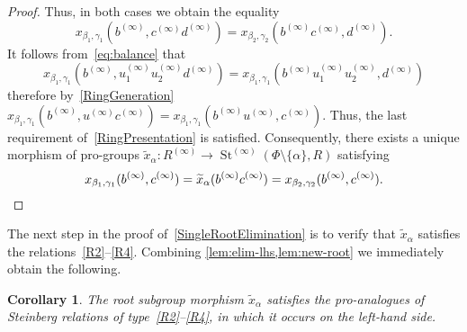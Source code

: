 \documentclass[oneside, 11pt]{amsart}
\numberwithin{equation}{section}
\newtheorem{corollary}[lemma]{Corollary}
\theoremstyle{definition}
\theoremstyle{remark}
\DeclareMathOperator\St{St}
\begin{document}
\begin{proof}
 Thus, in both cases we obtain the equality
 \begin{equation}\label{eq:balance}
 x_{\beta_1, \gamma_1}(b^{(\infty)}, c^{(\infty)} d^{(\infty)}) = x_{\beta_2, \gamma_2}(b^{(\infty)} c^{(\infty)}, d^{(\infty)}).
 \end{equation}
 It follows from~\eqref{eq:balance} that 
 \[x_{\beta_1,\gamma_1}(b^{(\infty)}, u_1^{(\infty)}u_2^{(\infty)}d^{(\infty)}) = x_{\beta_1,\gamma_1}(b^{(\infty)}u_1^{(\infty)}u_2^{(\infty)},d^{(\infty)})\] therefore by~\cref{RingGeneration}
 $x_{\beta_1, \gamma_1}(b^{(\infty)}, u^{(\infty)} c^{(\infty)}) = x_{\beta_1, \gamma_1}(b^{(\infty)} u^{(\infty)}, c^{(\infty)}).$
 Thus, the last requirement of~\cref{RingPresentation} is satisfied. Consequently, there exists a unique morphism of pro-groups \(\widetilde x_\alpha \colon R^{(\infty)} \to \St^{(\infty)}(\Phi \setminus \{\alpha\}, R)\) satisfying
 \begin{equation} \label{eq:new-root} x_{\beta_1, \gamma_1}(b^{(\infty)}, c^{(\infty)}) = \widetilde x_\alpha(b^{(\infty)} c^{(\infty)}) = x_{\beta_2, \gamma_2}(b^{(\infty)}, c^{(\infty)}). \qedhere\end{equation}
\end{proof}

The next step in the proof of~\cref{SingleRootElimination} is to verify that $\widetilde{x}_\alpha$ satisfies the relations~\eqref{R2}--\eqref{R4}.
Combining \cref{lem:elim-lhs,lem:new-root} we immediately obtain the following.
\begin{corollary} \label{cor:elim-lhs}
 The root subgroup morphism $\widetilde{x}_\alpha$ satisfies the pro-analogues of Steinberg relations of type~\eqref{R2}--\eqref{R4}, in which it occurs on the left-hand side.
\end{corollary}
\end{document}
